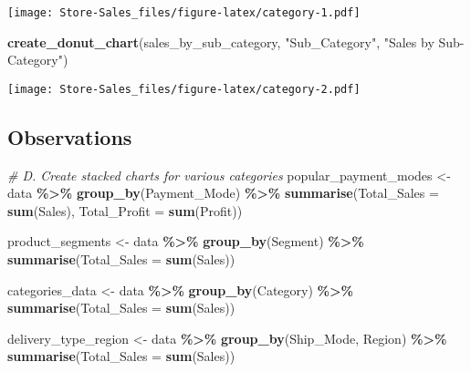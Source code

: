 \documentclass[
]{article}
\newenvironment{Shaded}{\begin{snugshade}}{\end{snugshade}}
\newcommand{\AttributeTok}[1]{\textcolor[rgb]{0.13,0.29,0.53}{#1}}
\newcommand{\CommentTok}[1]{\textcolor[rgb]{0.56,0.35,0.01}{\textit{#1}}}
\newcommand{\FunctionTok}[1]{\textcolor[rgb]{0.13,0.29,0.53}{\textbf{#1}}}
\newcommand{\NormalTok}[1]{#1}
\newcommand{\OtherTok}[1]{\textcolor[rgb]{0.56,0.35,0.01}{#1}}
\newcommand{\SpecialCharTok}[1]{\textcolor[rgb]{0.81,0.36,0.00}{\textbf{#1}}}
\newcommand{\StringTok}[1]{\textcolor[rgb]{0.31,0.60,0.02}{#1}}
\begin{document}
\texttt{[image: Store-Sales\_files/figure-latex/category-1.pdf]}

\begin{Shaded}
\begin{Highlighting}[]
\FunctionTok{create\_donut\_chart}\NormalTok{(sales\_by\_sub\_category, }\StringTok{"Sub\_Category"}\NormalTok{, }\StringTok{"Sales by Sub{-}Category"}\NormalTok{)}
\end{Highlighting}
\end{Shaded}

\texttt{[image: Store-Sales\_files/figure-latex/category-2.pdf]}

\hypertarget{observations}{%
\subsection{Observations}\label{observations}}

\begin{Shaded}
\begin{Highlighting}[]
\CommentTok{\# D. Create stacked charts for various categories}
\NormalTok{popular\_payment\_modes }\OtherTok{\textless{}{-}}\NormalTok{ data }\SpecialCharTok{\%\textgreater{}\%}
  \FunctionTok{group\_by}\NormalTok{(Payment\_Mode) }\SpecialCharTok{\%\textgreater{}\%}
  \FunctionTok{summarise}\NormalTok{(}\AttributeTok{Total\_Sales =} \FunctionTok{sum}\NormalTok{(Sales), }\AttributeTok{Total\_Profit =} \FunctionTok{sum}\NormalTok{(Profit))}

\NormalTok{product\_segments }\OtherTok{\textless{}{-}}\NormalTok{ data }\SpecialCharTok{\%\textgreater{}\%}
  \FunctionTok{group\_by}\NormalTok{(Segment) }\SpecialCharTok{\%\textgreater{}\%}
  \FunctionTok{summarise}\NormalTok{(}\AttributeTok{Total\_Sales =} \FunctionTok{sum}\NormalTok{(Sales))}

\NormalTok{categories\_data }\OtherTok{\textless{}{-}}\NormalTok{ data }\SpecialCharTok{\%\textgreater{}\%}
  \FunctionTok{group\_by}\NormalTok{(Category) }\SpecialCharTok{\%\textgreater{}\%}
  \FunctionTok{summarise}\NormalTok{(}\AttributeTok{Total\_Sales =} \FunctionTok{sum}\NormalTok{(Sales))}

\NormalTok{delivery\_type\_region }\OtherTok{\textless{}{-}}\NormalTok{ data }\SpecialCharTok{\%\textgreater{}\%}
  \FunctionTok{group\_by}\NormalTok{(Ship\_Mode, Region) }\SpecialCharTok{\%\textgreater{}\%}
  \FunctionTok{summarise}\NormalTok{(}\AttributeTok{Total\_Sales =} \FunctionTok{sum}\NormalTok{(Sales))}
\end{Highlighting}
\end{Shaded}
\end{document}
